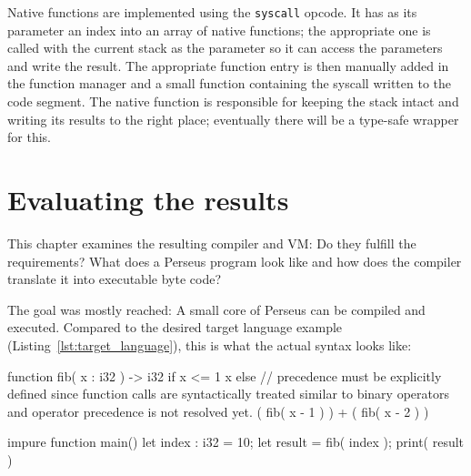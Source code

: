 		
		
		Native functions are implemented using the \lstinline$syscall$ opcode. It has as its parameter an index into an array of native functions; the appropriate one is called with the current stack as the parameter so it can access the parameters and write the result. The appropriate function entry is then manually added in the function manager and a small function containing the syscall written to the code segment. The native function is responsible for keeping the stack intact and writing its results to the right place; eventually there will be a type-safe wrapper for this.


\chapter{Evaluating the results}
This chapter examines the resulting compiler and VM: Do they fulfill the requirements? What does a Perseus program look like and how does the compiler translate it into executable byte code?

The goal was mostly reached: A small core of Perseus can be compiled and executed. Compared to the desired target language example (Listing~\ref{lst:target_language}), this is what the actual syntax looks like:

\begin{perseuslisting}[caption={Actual resulting language example},label={lst:result_language}]
function fib( x : i32 ) -> i32
    if x <= 1
        x
    else
    	// precedence must be explicitly defined since function calls are syntactically treated similar to binary operators and operator precedence is not resolved yet.
        ( fib( x - 1 ) ) + ( fib( x - 2 ) )

impure function main()
{
	let index : i32 = 10;
	let result = fib( index );
	print( result )
}
\end{perseuslisting}

